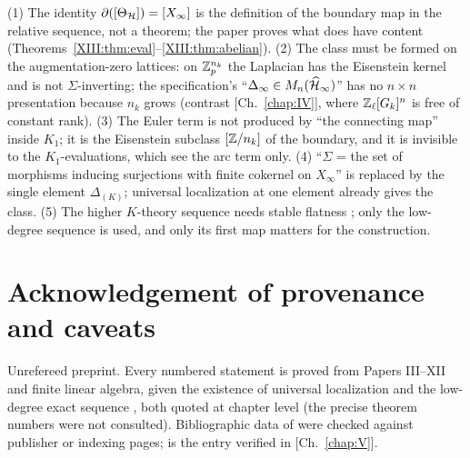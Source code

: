 \begin{remark}\label{XIII:rem:corrections}
(1) The identity $\partial([\Theta_{\mathcal{H}}])=[X_\infty]$ is the definition of the boundary map in
the relative sequence, not a theorem; the paper proves what does have content
(Theorems~\ref{XIII:thm:eval}--\ref{XIII:thm:abelian}). (2) The class must be formed on the
augmentation-zero lattices: on $\mathbb{Z}_p^{n_k}$ the Laplacian has the Eisenstein kernel and is not
$\Sigma$-inverting; the specification's ``$\Delta_\infty\in M_n(\widehat{\mathcal{H}}_\infty)$'' has no
$n\times n$ presentation because $n_k$ grows (contrast [Ch.~\ref{chap:IV}], where $\mathbb{Z}_\ell[G_k]^{n}$ is free of
constant rank). (3) The Euler term is not produced by ``the connecting map'' inside $K_1$;
it is the Eisenstein subclass $[\mathbb{Z}/n_k]$ of the boundary, and it is invisible to the
$K_1$-evaluations, which see the arc term only. (4) ``$\Sigma$ = the set of morphisms
inducing surjections with finite cokernel on $X_\infty$'' is replaced by the single element
$\Delta_{(K)}$; universal localization at one element already gives the class. (5) The
higher $K$-theory sequence needs stable flatness \cite{NR}; only the low-degree sequence
\cite{Sch} is used, and only its first map matters for the construction.
\end{remark}

\section*{Acknowledgement of provenance and caveats}

Unrefereed preprint. Every numbered statement is proved from Papers III--XII and finite
linear algebra, given the existence of universal localization \cite{Co} and the low-degree
exact sequence \cite[Ch.~4]{Sch}, both quoted at chapter level (the precise theorem numbers
were not consulted). Bibliographic data of \cite{Co,Sch,NR} were checked against publisher
or indexing pages; \cite{CFKSV} is the entry verified in [Ch.~\ref{chap:V}].
